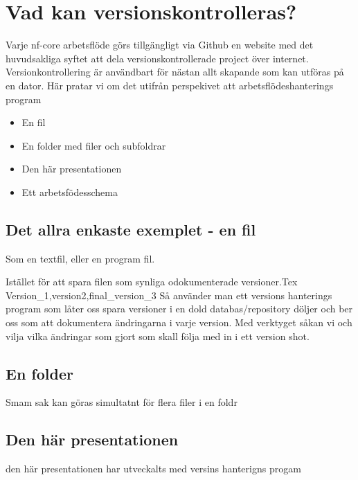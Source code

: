 \documentclass[
  letterpaper,
  DIV=11,
  numbers=noendperiod]{scrreprt}
\begin{document}

\chapter{Vad kan
versionskontrolleras?}\label{vad-kan-versionskontrolleras}

Varje nf-core arbetsflöde görs tillgängligt via Github en website med
det huvudsakliga syftet att dela versionskontrollerade project över
internet. Versionkontrollering är användbart för nästan allt skapande
som kan utföras på en dator. Här pratar vi om det utifrån perspekivet
att arbetsflödeshanterings program

\begin{itemize}
\item
  En fil
\item
  En folder med filer och subfoldrar
\item
  Den här presentationen
\item
  Ett arbetsfödesschema
\end{itemize}

\section{Det allra enkaste exemplet - en
fil}\label{det-allra-enkaste-exemplet---en-fil}

Som en textfil, eller en program fil.

Istället för att spara filen som synliga odokumenterade versioner.Tex
Version\_1,version2,final\_version\_3 Så använder man ett versions
hanterings program som låter oss spara versioner i en dold
databas/repository döljer och ber oss som att dokumentera ändringarna i
varje version. Med verktyget såkan vi och vilja vilka ändringar som
gjort som skall följa med in i ett version shot.

\section{En folder}\label{en-folder}

Smam sak kan göras simultatnt för flera filer i en foldr

\section{Den här presentationen}\label{den-huxe4r-presentationen}

den här presentationen har utveckalts med versins hanterigns progam
\end{document}
